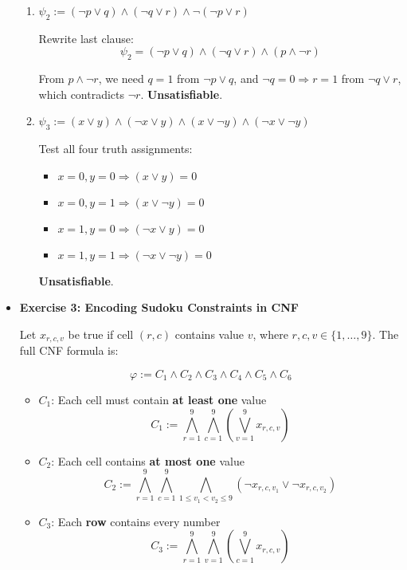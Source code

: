 \documentclass[11pt]{article}
\begin{document}
\begin{itemize}[leftmargin=*]
\begin{enumerate}
    \item \( \psi_2 := (\neg p \lor q) \land (\neg q \lor r) \land \neg(\neg p \lor r) \)

    Rewrite last clause:
    \[
    \psi_2 = (\neg p \lor q) \land (\neg q \lor r) \land (p \land \neg r)
    \]

    From \( p \land \neg r \), we need \( q = 1 \) from \( \neg p \lor q \), and \( \neg q = 0 \Rightarrow r = 1 \) from \( \neg q \lor r \), which contradicts \( \neg r \).  
    \textbf{Unsatisfiable}.

    \item \( \psi_3 := (x \lor y) \land (\neg x \lor y) \land (x \lor \neg y) \land (\neg x \lor \neg y) \)

    Test all four truth assignments:
    \begin{itemize}
        \item \( x = 0, y = 0 \Rightarrow (x \lor y) = 0 \)
        \item \( x = 0, y = 1 \Rightarrow (x \lor \neg y) = 0 \)
        \item \( x = 1, y = 0 \Rightarrow (\neg x \lor y) = 0 \)
        \item \( x = 1, y = 1 \Rightarrow (\neg x \lor \neg y) = 0 \)
    \end{itemize}
    \textbf{Unsatisfiable}.
\end{enumerate}

\vspace{1em}

\item \textbf{Exercise 3: Encoding Sudoku Constraints in CNF}

Let \( x_{r,c,v} \) be true if cell \( (r, c) \) contains value \( v \), where \( r, c, v \in \{1, \dots, 9\} \). The full CNF formula is:

\[
\varphi := C_1 \land C_2 \land C_3 \land C_4 \land C_5 \land C_6
\]

\begin{itemize}
    \item \( C_1 \): Each cell must contain \textbf{at least one} value
    \[
    C_1 := \bigwedge_{r=1}^{9} \bigwedge_{c=1}^{9} \left( \bigvee_{v=1}^{9} x_{r,c,v} \right)
    \]

    \item \( C_2 \): Each cell contains \textbf{at most one} value
    \[
    C_2 := \bigwedge_{r=1}^{9} \bigwedge_{c=1}^{9} \bigwedge_{1 \leq v_1 < v_2 \leq 9} (\neg x_{r,c,v_1} \lor \neg x_{r,c,v_2})
    \]

    \item \( C_3 \): Each \textbf{row} contains every number
    \[
    C_3 := \bigwedge_{r=1}^{9} \bigwedge_{v=1}^{9} \left( \bigvee_{c=1}^{9} x_{r,c,v} \right)
    \]


\end{itemize}
\end{itemize}
\end{document}
